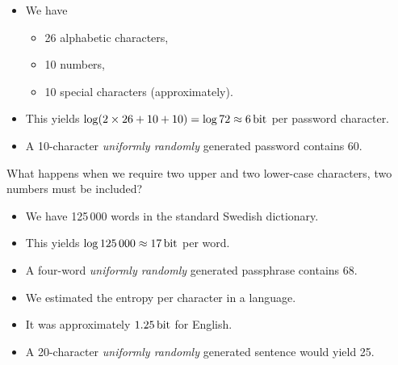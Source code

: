 \documentclass{beamer}
\begin{document}
\begin{frame}
  \begin{example}
    \begin{itemize}
      \item We have
        \begin{itemize}
          \item 26 alphabetic characters,
          \item 10 numbers,
          \item 10 special characters (approximately).
        \end{itemize}

      \item This yields \(\log( 2\times 26 + 10 + 10 ) = \log 72 \approx 
          \SI{6}{\bit}\) per password character.

      \item A 10-character \emph{uniformly randomly} generated password 
        contains \SI{60}{\bit}.
    \end{itemize}
  \end{example}

  \pause{}

  \begin{remark}
    What happens when we require two upper and two lower-case characters, two 
    numbers must be included?
  \end{remark}
\end{frame}

\begin{frame}
  \begin{example}
    \begin{itemize}
      \item We have 125\,000 words in the standard Swedish dictionary.
      \item This yields \(\log 125\,000\approx \SI{17}{\bit}\) per word.
      \item A four-word \emph{uniformly randomly} generated passphrase contains
        \SI{68}{\bit}.
    \end{itemize}
  \end{example}
\end{frame}

\begin{frame}
  \begin{example}
    \begin{itemize}
      \item We estimated the entropy per character in a language.
      \item It was approximately \(\SI{1.25}{\bit}\) for English.
      \item A 20-character \emph{uniformly randomly} generated sentence would 
        yield \SI{25}{\bit}.
    \end{itemize}
  \end{example}
\end{frame}
\end{document}
